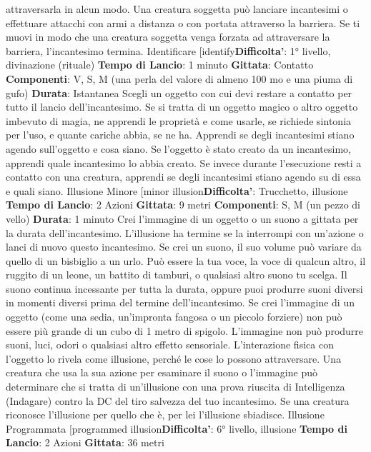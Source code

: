\begin{multicols}{2}
attraversarla in alcun modo. Una creatura soggetta può
lanciare incantesimi o effettuare attacchi con armi a
distanza o con portata attraverso la barriera.
Se ti muovi in modo che una creatura soggetta venga
forzata ad attraversare la barriera, l’incantesimo
termina.
Identificare
[identify\textbf{Difficolta'}:
1° livello, divinazione (rituale)
\textbf{Tempo di Lancio}: 1 minuto
\textbf{Gittata}: Contatto
\textbf{Componenti}: V, S, M (una perla del valore di almeno
100 mo e una piuma di gufo)
\textbf{Durata}: Istantanea
Scegli un oggetto con cui devi restare a contatto per
tutto il lancio dell’incantesimo. Se si tratta di un oggetto
magico o altro oggetto imbevuto di magia, ne apprendi
le proprietà e come usarle, se richiede sintonia per
l’uso, e quante cariche abbia, se ne ha. Apprendi se
degli incantesimi stiano agendo sull’oggetto e cosa
siano. Se l’oggetto è stato creato da un incantesimo,
apprendi quale incantesimo lo abbia creato.
Se invece durante l’esecuzione resti a contatto con una
creatura, apprendi se degli incantesimi stiano agendo
su di essa e quali siano.
Illusione Minore
[minor illusion\textbf{Difficolta'}:
Trucchetto, illusione
\textbf{Tempo di Lancio}: 2 Azioni
\textbf{Gittata}: 9 metri
\textbf{Componenti}: S, M (un pezzo di vello)
\textbf{Durata}: 1 minuto
Crei l’immagine di un oggetto o un suono a gittata per la
durata dell’incantesimo. L’illusione ha termine se la
interrompi con un’azione o lanci di nuovo questo
incantesimo.
Se crei un suono, il suo volume può variare da quello di
un bisbiglio a un urlo. Può essere la tua voce, la voce di
qualcun altro, il ruggito di un leone, un battito di
tamburi, o qualsiasi altro suono tu scelga. Il suono
continua incessante per tutta la durata, oppure puoi
produrre suoni diversi in momenti diversi prima del
termine dell’incantesimo.
Se crei l’immagine di un oggetto (come una sedia,
un’impronta fangosa o un piccolo forziere) non può
essere più grande di un cubo di 1 metro di spigolo.
L’immagine non può produrre suoni, luci, odori o
qualsiasi altro effetto sensoriale. L’interazione fisica con
l’oggetto lo rivela come illusione, perché le cose lo
possono attraversare.
Una creatura che usa la sua azione per esaminare il
suono o l’immagine può determinare che si tratta di
un’illusione con una prova riuscita di Intelligenza
(Indagare) contro la DC del tiro salvezza del tuo
incantesimo. Se una creatura riconosce l’illusione per
quello che è, per lei l’illusione sbiadisce.
Illusione Programmata
[programmed illusion\textbf{Difficolta'}:
6° livello, illusione
\textbf{Tempo di Lancio}: 2 Azioni
\textbf{Gittata}: 36 metri

\end{multicols}
